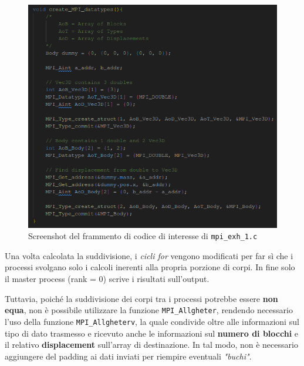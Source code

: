 \documentclass[12pt]{report}
\begin{document}
    \begin{figure}[H]
        \centering
        \includegraphics[width=\textwidth]{images/mpi_exh_1_2.png}
        \caption{Screenshot del frammento di codice di interesse di \texttt{mpi\_exh\_1.c}}
        \label{fig:mpi_exh_1_2}
    \end{figure}

    Una volta calcolata la suddivisione, i \textit{cicli for} vengono modificati per far sì che i processi svolgano solo i calcoli inerenti alla propria porzione di corpi. In fine solo il master process (rank = 0) scrive i risultati sull'output.

    Tuttavia, poiché la suddivisione dei corpi tra i processi potrebbe essere \textbf{non equa}, non è possibile utilizzare la funzione \texttt{MPI\_Allgheter}, rendendo necessario l'uso della funzione \texttt{MPI\_Allgheterv}, la quale condivide oltre alle informazioni sul tipo di dato trasmesso e ricevuto anche le informazioni sul \textbf{numero di blocchi} e il relativo \textbf{displacement} sull'array di destinazione. In tal modo, non è necessario aggiungere del padding ai dati inviati per riempire eventuali \textit{"buchi"}.
\end{document}
